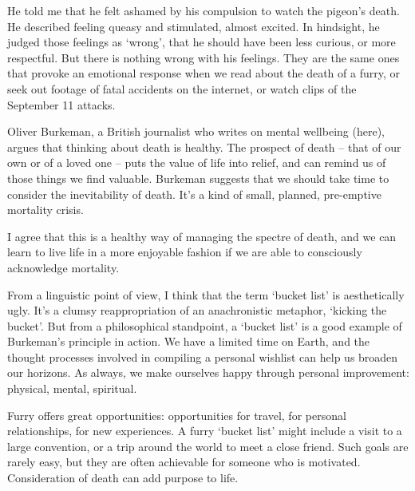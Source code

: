 He told me that he felt ashamed by his compulsion to watch the pigeon's death. He described feeling queasy and stimulated, almost excited. In hindsight, he judged those feelings as `wrong', that he should have been less curious, or more respectful. But there is nothing wrong with his feelings. They are the same ones that provoke an emotional response when we read about the death of a furry, or seek out footage of fatal accidents on the internet, or watch clips of the September 11 attacks.

Oliver Burkeman, a British journalist who writes on mental wellbeing (here), argues that thinking about death is healthy. The prospect of death -- that of our own or of a loved one -- puts the value of life into relief, and can remind us of those things we find valuable. Burkeman suggests that we should take time to consider the inevitability of death. It's a kind of small, planned, pre-emptive mortality crisis.

I agree that this is a healthy way of managing the spectre of death, and we can learn to live life in a more enjoyable fashion if we are able to consciously acknowledge mortality.

From a linguistic point of view, I think that the term `bucket list' is aesthetically ugly. It's a clumsy reappropriation of an anachronistic metaphor, `kicking the bucket'. But from a philosophical standpoint, a `bucket list' is a good example of Burkeman's principle in action. We have a limited time on Earth, and the thought processes involved in compiling a personal wishlist can help us broaden our horizons. As always, we make ourselves happy through personal improvement: physical, mental, spiritual.

Furry offers great opportunities: opportunities for travel, for personal relationships, for new experiences. A furry `bucket list' might include a visit to a large convention, or a trip around the world to meet a close friend. Such goals are rarely easy, but they are often achievable for someone who is motivated. Consideration of death can add purpose to life.
